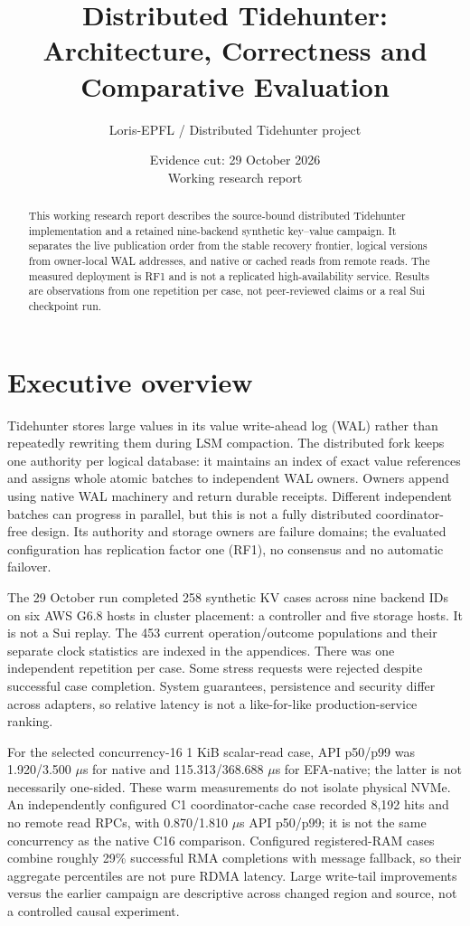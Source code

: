 \documentclass[11pt,a4paper]{article}
\title{Distributed Tidehunter: Architecture, Correctness and Comparative Evaluation}
\author{Loris-EPFL / Distributed Tidehunter project}
\date{Evidence cut: 29 October 2026\\ Working research report}
\begin{document}
\maketitle
\begin{abstract}
This working research report describes the source-bound distributed Tidehunter implementation and a retained nine-backend synthetic key--value campaign. It separates the live publication order from the stable recovery frontier, logical versions from owner-local WAL addresses, and native or cached reads from remote reads. The measured deployment is RF1 and is not a replicated high-availability service. Results are observations from one repetition per case, not peer-reviewed claims or a real Sui checkpoint run.
\end{abstract}
\tableofcontents
\clearpage
\section{Executive overview}\label{sec:overview}
Tidehunter stores large values in its value write-ahead log (WAL) rather than repeatedly rewriting them during LSM compaction. The distributed fork keeps one authority per logical database: it maintains an index of exact value references and assigns whole atomic batches to independent WAL owners. Owners append using native WAL machinery and return durable receipts. Different independent batches can progress in parallel, but this is not a fully distributed coordinator-free design. Its authority and storage owners are failure domains; the evaluated configuration has replication factor one (RF1), no consensus and no automatic failover.

The 29 October run completed 258 synthetic KV cases across nine backend IDs on six AWS G6.8 hosts in cluster placement: a controller and five storage hosts. It is not a Sui replay. The 453 current operation/outcome populations and their separate clock statistics are indexed in the appendices. There was one independent repetition per case. Some stress requests were rejected despite successful case completion. System guarantees, persistence and security differ across adapters, so relative latency is not a like-for-like production-service ranking.

For the selected concurrency-16 1 KiB scalar-read case, API p50/p99 was 1.920/3.500 $\mu$s for native and 115.313/368.688 $\mu$s for EFA-native; the latter is not necessarily one-sided. These warm measurements do not isolate physical NVMe. An independently configured C1 coordinator-cache case recorded 8,192 hits and no remote read RPCs, with 0.870/1.810 $\mu$s API p50/p99; it is not the same concurrency as the native C16 comparison. Configured registered-RAM cases combine roughly 29\% successful RMA completions with message fallback, so their aggregate percentiles are not pure RDMA latency. Large write-tail improvements versus the earlier campaign are descriptive across changed region and source, not a controlled causal experiment.
\end{document}
